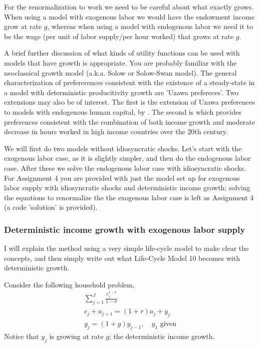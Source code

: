 For the renormalization to work we need to be careful about what exactly grows. When using a model with exogenous labor we would have the endowment income grow at rate $g$, whereas when using a model with endogenous labor we need it to be the wage (per unit of labor supply/per hour worked) that grows at rate $g$.

A brief further discussion of what kinds of utility functions can be used with models that have growth is appropriate. You are probably familiar with the neoclassical growth model (a.k.a. Solow or Solow-Swan model). The general characterization of prefererences consistent with the existence of a steady-state in a model with deterministic producitivity growth are 'Uzawa prefereces'. Two extensions may also be of interest. The first is the extension of Uzawa preferences to models with endogenous human capital, by \cite*{GrossmanHelpmanOberfieldSampson2017}. The second is \cite*{BoppartKrusell2020} which provides preferences consistent with the combination of both income growth and moderate decrease in hours worked in high income countries over the 20th century.

We will first do two models without idiosyncratic shocks. Let's start with the exogenous labor case, as it is slightly simpler, and then do the endogenous labor case. After these we solve the endogenous labor case with idiosyncratic shocks. For Assignment 4 you are provided with just the model set up for exogenous labor supply with idiosyncratic shocks and deterministic income growth; solving the equations to renormalize the  the exogenous labor case is left as Assignment 4 (a code 'solution' is provided).

\subsubsection{Deterministic income growth with exogenous labor supply}
I will explain the method using a very simple life-cycle model to make clear the concepts, and then simply write out what Life-Cycle Model 10 becomes with deterministic growth.

Consider the following household problem,
\begin{eqnarray*}
    \sum_{j=1}^J \frac{c_j^{1-\sigma}}{1-\sigma} \\
    c_j+a_{j+1}=(1+r)a_j + y_j \\
    y_j=(1+g)y_{j-1}, \quad y_1\text{ given}
\end{eqnarray*}
Notice that $y_j$ is growing at rate $g$; the deterministic income growth.

